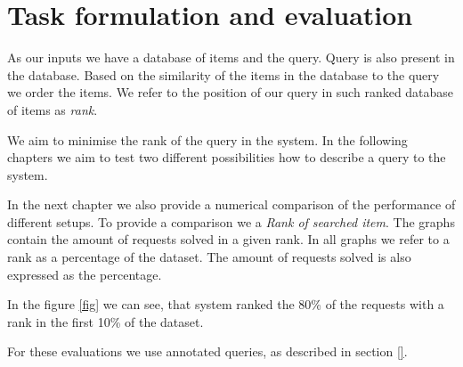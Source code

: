 \section*{Task formulation and evaluation}

As our inputs we have a database of items and the query. Query is also present in the database. Based on the similarity of the items in the database to the query we order the items. We refer to the position of our query in such ranked database of items as \emph{rank}.

We aim to minimise the rank of the query in the system. In the following chapters we aim to test two different possibilities how to describe a query to the system.

In the next chapter we also provide a numerical comparison of the performance of different setups. To provide a comparison we a \emph{Rank of searched item}. The graphs contain the amount of requests solved in a given rank. In all graphs we refer to a rank as a percentage of the dataset. The amount of requests solved is also expressed as the percentage.

In the figure \ref{fig} we can see, that system ranked the 80\% of the requests with a rank in the first 10\% of the dataset.

For these evaluations we use annotated queries, as described in section \ref{}.

